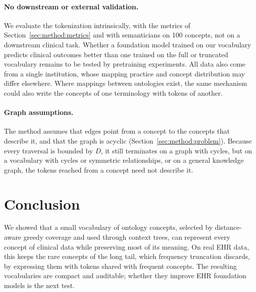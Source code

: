 \paragraph{No downstream or external validation.}
We evaluate the tokenization intrinsically, with the metrics of Section~\ref{sec:method:metrics} and with semanticians on 100 concepts, not on a downstream clinical task.
Whether a foundation model trained on our vocabulary predicts clinical outcomes better than one trained on the full or truncated vocabulary remains to be tested by pretraining experiments.
All data also come from a single institution, whose mapping practice and concept distribution may differ elsewhere.
Where mappings between ontologies exist, the same mechanism could also write the concepts of one terminology with tokens of another.

\paragraph{Graph assumptions.}
The method assumes that edges point from a concept to the concepts that describe it, and that the graph is acyclic (Section~\ref{sec:method:problem}).
Because every traversal is bounded by $D$, it still terminates on a graph with cycles, but on a vocabulary with cycles or symmetric relationships, or on a general knowledge graph, the tokens reached from a concept need not describe it.

\section{Conclusion}
\label{sec:conclusion}

We showed that a small vocabulary of ontology concepts, selected by distance-aware greedy coverage and used through context trees, can represent every concept of clinical data while preserving most of its meaning.
On real EHR data, this keeps the rare concepts of the long tail, which frequency truncation discards, by expressing them with tokens shared with frequent concepts.
The resulting vocabularies are compact and auditable; whether they improve EHR foundation models is the next test.
